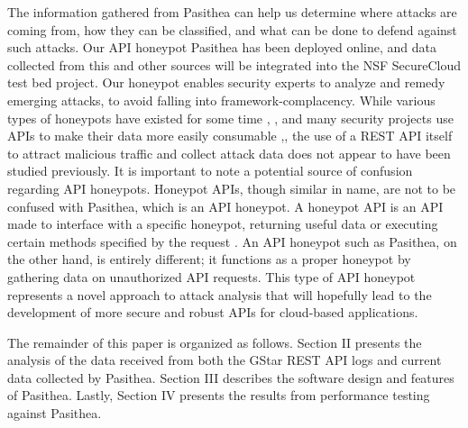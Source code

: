 The information gathered from Pasithea can help us determine where attacks are coming from, how they can be classified, and what can be done to defend against such attacks.  Our API honeypot Pasithea has been deployed online, and data collected from this and other sources will be integrated into the NSF SecureCloud test bed project.  Our honeypot enables security experts to analyze and remedy emerging attacks, to avoid falling into framework-complacency.  While various types of honeypots have existed for some time \cite{Stoll:1989:CET:67554}, \cite{Provos:2004:VHF:1251375.1251376}, and many security projects use APIs to make their data more easily consumable \cite{Graham:2008:FAD:1355323},\cite{SCADA-Testbed-API}, the use of a REST API itself to attract malicious traffic and collect attack data does not appear to have been studied previously.  It is important to note a potential source of confusion regarding API honeypots. Honeypot APIs, though similar in name, are not to be confused with Pasithea, which is an API honeypot. A honeypot API is an API made to interface with a specific honeypot, returning useful data or executing certain methods specified by the request \cite{Honeypot-API}. An API honeypot such as Pasithea, on the other hand, is entirely different; it functions as a proper honeypot by gathering data on unauthorized API requests.  This type of API honeypot represents a novel approach to attack analysis that will hopefully lead to the development of more secure and robust APIs for cloud-based applications.

The remainder of this paper is organized as follows. Section II presents the analysis of the data received from both the GStar REST API logs and current data collected by Pasithea. Section III describes the software design and features of Pasithea. Lastly, Section IV presents the results from performance testing against Pasithea.

